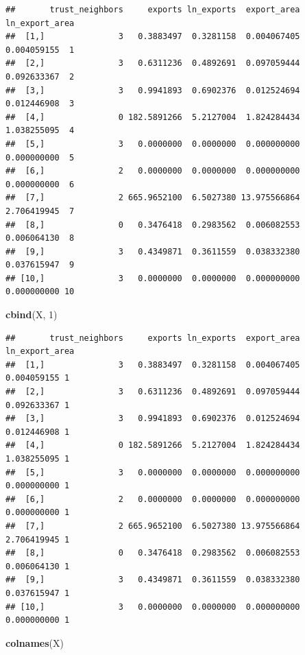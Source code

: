 \documentclass[
]{book}
\newenvironment{Shaded}{\begin{snugshade}}{\end{snugshade}}
\newcommand{\DecValTok}[1]{\textcolor[rgb]{0.00,0.00,0.81}{#1}}
\newcommand{\KeywordTok}[1]{\textcolor[rgb]{0.13,0.29,0.53}{\textbf{#1}}}
\newcommand{\NormalTok}[1]{#1}
\theoremstyle{definition}
\theoremstyle{definition}
\theoremstyle{definition}
\theoremstyle{remark}
\begin{document}
\begin{verbatim}
##       trust_neighbors     exports ln_exports  export_area ln_export_area   
##  [1,]               3   0.3883497  0.3281158  0.004067405    0.004059155  1
##  [2,]               3   0.6311236  0.4892691  0.097059444    0.092633367  2
##  [3,]               3   0.9941893  0.6902376  0.012524694    0.012446908  3
##  [4,]               0 182.5891266  5.2127004  1.824284434    1.038255095  4
##  [5,]               3   0.0000000  0.0000000  0.000000000    0.000000000  5
##  [6,]               2   0.0000000  0.0000000  0.000000000    0.000000000  6
##  [7,]               2 665.9652100  6.5027380 13.975566864    2.706419945  7
##  [8,]               0   0.3476418  0.2983562  0.006082553    0.006064130  8
##  [9,]               3   0.4349871  0.3611559  0.038332380    0.037615947  9
## [10,]               3   0.0000000  0.0000000  0.000000000    0.000000000 10
\end{verbatim}

\begin{Shaded}
\begin{Highlighting}[]
\KeywordTok{cbind}\NormalTok{(X, }\DecValTok{1}\NormalTok{)}
\end{Highlighting}
\end{Shaded}

\begin{verbatim}
##       trust_neighbors     exports ln_exports  export_area ln_export_area  
##  [1,]               3   0.3883497  0.3281158  0.004067405    0.004059155 1
##  [2,]               3   0.6311236  0.4892691  0.097059444    0.092633367 1
##  [3,]               3   0.9941893  0.6902376  0.012524694    0.012446908 1
##  [4,]               0 182.5891266  5.2127004  1.824284434    1.038255095 1
##  [5,]               3   0.0000000  0.0000000  0.000000000    0.000000000 1
##  [6,]               2   0.0000000  0.0000000  0.000000000    0.000000000 1
##  [7,]               2 665.9652100  6.5027380 13.975566864    2.706419945 1
##  [8,]               0   0.3476418  0.2983562  0.006082553    0.006064130 1
##  [9,]               3   0.4349871  0.3611559  0.038332380    0.037615947 1
## [10,]               3   0.0000000  0.0000000  0.000000000    0.000000000 1
\end{verbatim}

\begin{Shaded}
\begin{Highlighting}[]
\KeywordTok{colnames}\NormalTok{(X)}
\end{Highlighting}
\end{Shaded}
\end{document}
